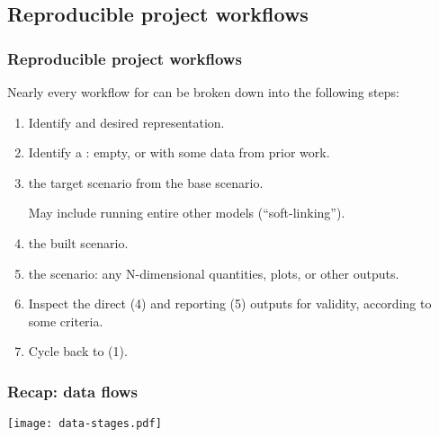 \documentclass[12pt,aspectratio=169]{beamer}
\begin{document}
\subsection{Reproducible project workflows}

\begin{frame}
\frametitle{Reproducible project workflows}

Nearly every workflow for  can be broken down into the following steps:

\bigskip
\begin{enumerate}
  \item Identify  and desired representation.
  \item Identify a : empty, or with some data from prior work.
  \item {} the target scenario from the base scenario.

  May include running entire other models (“soft-linking”).
  \item {} the built scenario.
  \item {} the scenario: any N-dimensional quantities, plots, or other outputs.
  \item Inspect the direct (4) and reporting (5) outputs for validity, according to some criteria.
  \item Cycle back to (1).
\end{enumerate}

\end{frame}

\begin{frame}
  \frametitle{Recap: data flows}
  \hspace*{-10mm}\texttt{[image: data-stages.pdf]}
\end{frame}
\end{document}
